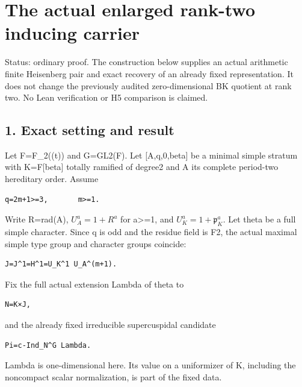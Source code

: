 \clearpage
\section{The actual enlarged rank-two inducing carrier}\label{app:rank2}

Status: ordinary proof. The construction below supplies an actual
arithmetic finite Heisenberg pair and exact recovery of an already fixed
representation. It does not change the previously audited
zero-dimensional BK quotient at rank two. No Lean verification or H5
comparison is claimed.

\hypertarget{rank2-exact-setting-and-result}{%
\subsection{1. Exact setting and
result}\label{rank2-exact-setting-and-result}}

Let F=F\_2((t)) and G=GL2(F). Let {[}A,q,0,beta{]} be a minimal simple
stratum with K=F{[}beta{]} totally ramified of degree2 and A its
complete period-two hereditary order. Assume

\begin{Verbatim}[fontsize=\small,breaklines=true,breakanywhere=true]
q=2m+1>=3,       m>=1.
\end{Verbatim}

Write R=rad(A), \(U_A^a=1+R^a\) for a\textgreater=1, and
\(U_K^a=1+\mathfrak p_K^a\). Let theta be a full simple character.
Since q is odd and the residue field is F2, the actual maximal simple
type group and character groups coincide:

\begin{Verbatim}[fontsize=\small,breaklines=true,breakanywhere=true]
J=J^1=H^1=U_K^1 U_A^(m+1).
\end{Verbatim}

Fix the full actual extension Lambda of theta to

\begin{Verbatim}[fontsize=\small,breaklines=true,breakanywhere=true]
N=K×J,
\end{Verbatim}

and the already fixed irreducible supercuspidal candidate

\begin{Verbatim}[fontsize=\small,breaklines=true,breakanywhere=true]
Pi=c-Ind_N^G Lambda.
\end{Verbatim}

Lambda is one-dimensional here. Its value on a uniformizer of K,
including the noncompact scalar normalization, is part of the fixed
data.

